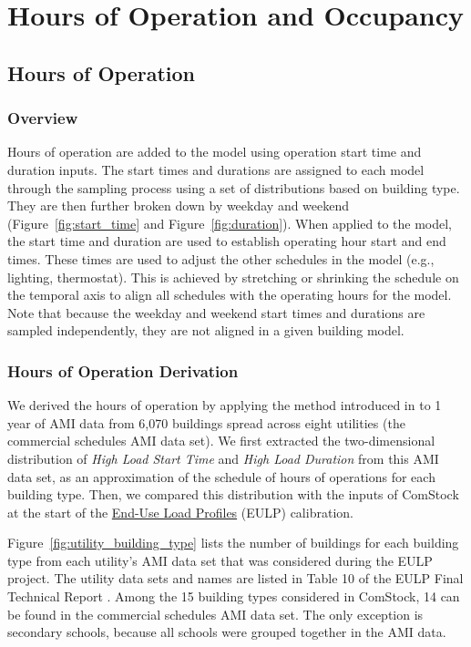\section{Hours of Operation and Occupancy}
\label{sec:hoo}

\subsection{Hours of Operation}
\subsubsection{Overview}
Hours of operation are added to the model using operation start time and duration inputs. The start times and durations are assigned to each model through the sampling process using a set of distributions based on building type. They are then further broken down by weekday and weekend (Figure~\ref{fig:start_time} and Figure~\ref{fig:duration}). When applied to the model, the start time and duration are used to establish operating hour start and end times. These times are used to adjust the other schedules in the model (e.g., lighting, thermostat). This is achieved by stretching or shrinking the schedule on the temporal axis to align all schedules with the operating hours for the model. Note that because the weekday and weekend start times and durations are sampled independently, they are not aligned in a given building model.

\subsubsection{Hours of Operation Derivation}
We derived the hours of operation by applying the method introduced in \cite{bianchi2020modeling} to 1 year of AMI data from 6,070 buildings spread across eight utilities (the commercial schedules AMI data set). We first extracted the two-dimensional distribution of \textit{High Load Start Time} and \textit{High Load Duration} from this AMI data set, as an approximation of the schedule of hours of operations for each building type. Then, we compared this distribution with the inputs of ComStock at the start of
 the \href{https://www.nrel.gov/buildings/end-use-load-profiles.html}{End-Use Load Profiles} (EULP) calibration.

Figure~\ref{fig:utility_building_type} lists the number of buildings for each building type from each utility's AMI data set that was considered during the EULP project. The utility data sets and names are listed in Table 10 of the EULP Final Technical Report \citep{eulp_final_report}. Among the 15 building types considered in ComStock, 14 can be found in the commercial schedules AMI data set. The only exception is secondary schools, because all schools were grouped together in the AMI data.

